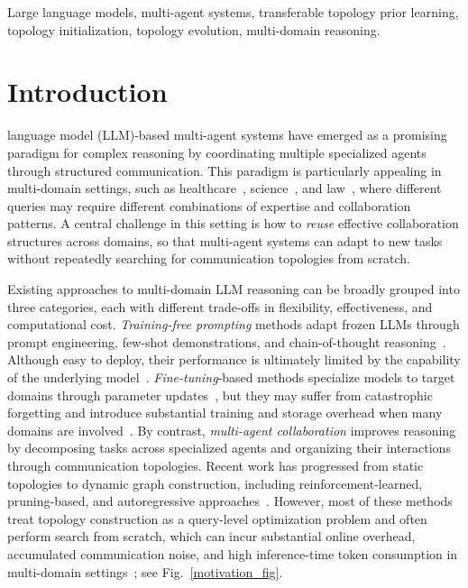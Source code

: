 \documentclass[lettersize,journal]{IEEEtran}
\theoremstyle{plain}
\begin{document}
\begin{IEEEkeywords}
Large language models, multi-agent systems, transferable topology prior learning, topology initialization, topology evolution, multi-domain reasoning.
\end{IEEEkeywords}

\section{Introduction}
 language model (LLM)-based multi-agent systems have emerged as a promising paradigm for complex reasoning by coordinating multiple specialized agents through structured communication. This paradigm is particularly appealing in multi-domain settings, such as healthcare~\cite{medical_tc}, science~\cite{DBLP:conf/iclr/HendrycksBBZMSS21,DBLP:conf/nips/HuangBZZZSLLZLF23}, and law~\cite{DBLP:conf/lrec/NghiemBFA22,DBLP:journals/corr/abs-2510-08524}, where different queries may require different combinations of expertise and collaboration patterns. A central challenge in this setting is how to \emph{reuse} effective collaboration structures across domains, so that multi-agent systems can adapt to new tasks without repeatedly searching for communication topologies from scratch.

Existing approaches to multi-domain LLM reasoning can be broadly grouped into three categories, each with different trade-offs in flexibility, effectiveness, and computational cost. \textit{Training-free prompting} methods adapt frozen LLMs through prompt engineering, few-shot demonstrations, and chain-of-thought reasoning~\cite{DBLP:conf/nips/ChenHWJ23,DBLP:conf/emnlp/NguyenLZZY23,DBLP:conf/emnlp/Hu0YXW024}. Although easy to deploy, their performance is ultimately limited by the capability of the underlying model~\cite{DBLP:conf/acl/ZhangWQLZHXLY025}. \textit{Fine-tuning}-based methods specialize models to target domains through parameter updates~\cite{DBLP:conf/emnlp/ScialomCM22,DBLP:journals/corr/abs-2502-04380}, but they may suffer from catastrophic forgetting and introduce substantial training and storage overhead when many domains are involved~\cite{DBLP:journals/pami/LiYDZS24,DBLP:conf/icml/Liang00LWCH25}. By contrast, \textit{multi-agent collaboration} improves reasoning by decomposing tasks across specialized agents and organizing their interactions through communication topologies. Recent work has progressed from static topologies to dynamic graph construction, including reinforcement-learned, pruning-based, and autoregressive approaches~\cite{DBLP:conf/iclr/HongZCZCWZWYLZR24,liu2024,DBLP:conf/iclr/ZhangYLYWWCY025,DBLP:conf/icml/ZhangYSWYF00C25}. However, most of these methods treat topology construction as a query-level optimization problem and often perform search from scratch, which can incur substantial online overhead, accumulated communication noise, and high inference-time token consumption in multi-domain settings~\cite{li-etal-2025-multi-agent}; see Fig.~\ref{motivation_fig}.
\end{document}
